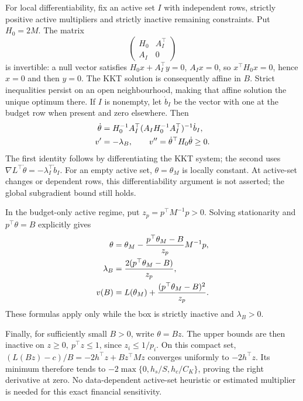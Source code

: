 \documentclass[11pt]{article}
\begin{document}
For local differentiability, fix an active set $I$ with independent
rows, strictly positive active multipliers and strictly inactive
remaining constraints. Put $H_0=2M$. The matrix
\begin{equation}
 \begin{pmatrix}H_0&A_I^\top\\A_I&0\end{pmatrix}
 \label{eq:h-kkt-system}
\end{equation}
is invertible: a null vector satisfies $H_0x+A_I^\top y=0$,
$A_Ix=0$, so $x^\top H_0x=0$, hence $x=0$ and then $y=0$.
The KKT solution is consequently affine in $B$. Strict inequalities
persist on an open neighbourhood, making that affine solution the
unique optimum there. If $I$ is nonempty, let $\dot b_I$ be the vector
with one at the budget row when present and zero elsewhere. Then
\begin{align}
 \dot\theta&=H_0^{-1}A_I^\top
 (A_IH_0^{-1}A_I^\top)^{-1}\dot b_I,\notag\\
 v'&=-\lambda_B,\qquad v''=\dot\theta^\top H_0\dot\theta\geq0.
 \label{eq:h-local-budget-sensitivity}
\end{align}
The first identity follows by differentiating the KKT system; the
second uses $\nabla L^\top\dot\theta=-\lambda_I^\top\dot b_I$.
For an empty active set, $\theta=\theta_M$ is locally constant.
At active-set changes or dependent rows, this differentiability
argument is not asserted; the global subgradient bound still holds.

In the budget-only active regime, put $z_p=p^\top M^{-1}p>0$.
Solving stationarity and $p^\top\theta=B$ explicitly gives
\begin{align}
 \theta&=\theta_M-\frac{p^\top\theta_M-B}{z_p}M^{-1}p,\notag\\
 \lambda_B&=\frac{2(p^\top\theta_M-B)}{z_p},\notag\\
 v(B)&=L(\theta_M)+\frac{(p^\top\theta_M-B)^2}{z_p}.
 \label{eq:h-budget-only-regime}
\end{align}
These formulas apply only while the box is strictly inactive and
$\lambda_B>0$.

Finally, for sufficiently small $B>0$, write $\theta=Bz$.
The upper bounds are then inactive on
$z\geq0,\ p^\top z\leq1$, since $z_i\leq1/p_i$.
On this compact set,
$(L(Bz)-c)/B=-2h^\top z+Bz^\top Mz$ converges uniformly to
$-2h^\top z$. Its minimum therefore tends to
$-2\max\{0,h_s/S,h_c/C_K\}$, proving the right derivative at zero.
No data-dependent active-set heuristic or estimated multiplier is
needed for this exact financial sensitivity.
\end{document}
